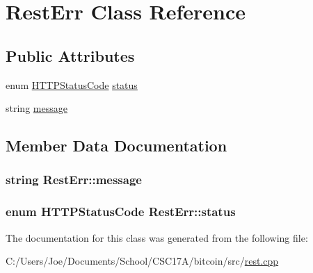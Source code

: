 \hypertarget{class_rest_err}{}\section{Rest\+Err Class Reference}
\label{class_rest_err}
\subsection*{Public Attributes}
\begin{DoxyCompactItemize}
\item 
enum \hyperlink{rpcprotocol_8h_ab0a9668b7d736b4d4d621ec010928a46}{H\+T\+T\+P\+Status\+Code} \hyperlink{class_rest_err_a4d255c35df09d8909dcc4014bfbe106b}{status}
\item 
string \hyperlink{class_rest_err_a0235d86cbc21e56c7c635a7fb0d7a52d}{message}
\end{DoxyCompactItemize}


\subsection{Member Data Documentation}
\hypertarget{class_rest_err_a0235d86cbc21e56c7c635a7fb0d7a52d}{}
\subsubsection[{message}]{\setlength{\rightskip}{0pt plus 5cm}string Rest\+Err\+::message}\label{class_rest_err_a0235d86cbc21e56c7c635a7fb0d7a52d}
\hypertarget{class_rest_err_a4d255c35df09d8909dcc4014bfbe106b}{}
\subsubsection[{status}]{\setlength{\rightskip}{0pt plus 5cm}enum {\bf H\+T\+T\+P\+Status\+Code} Rest\+Err\+::status}\label{class_rest_err_a4d255c35df09d8909dcc4014bfbe106b}


The documentation for this class was generated from the following file\+:\begin{DoxyCompactItemize}
\item 
C\+:/\+Users/\+Joe/\+Documents/\+School/\+C\+S\+C17\+A/bitcoin/src/\hyperlink{rest_8cpp}{rest.\+cpp}\end{DoxyCompactItemize}

